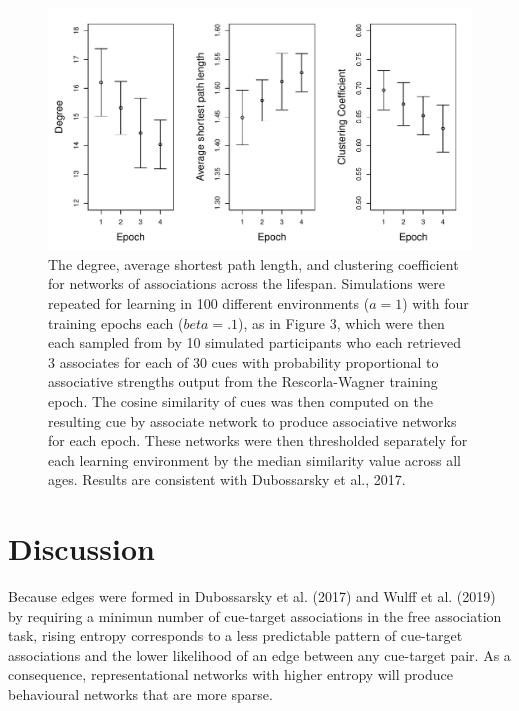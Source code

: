 \documentclass[
  man]{apa6}
\begin{document}
\begin{figure}

{\centering \includegraphics[width=1\linewidth]{NetworkAssociations} 

}

\caption{The degree, average shortest path length, and clustering coefficient for networks of associations across the lifespan. Simulations were repeated for learning in 100 different environments ($a=1$) with four training epochs each ($beta=.1$), as in Figure 3, which were then each sampled from by 10 simulated participants who each retrieved 3 associates for each of 30 cues with probability proportional to associative strengths output from the Rescorla-Wagner training epoch. The cosine similarity of cues was then computed on the resulting cue by associate network to produce associative networks for each epoch. These networks were then thresholded separately for each learning environment by the median similarity value across all ages. Results are consistent with Dubossarsky et al., 2017.}\label{fig:unnamed-chunk-2}
\end{figure}

\hypertarget{discussion}{%
\section{Discussion}\label{discussion}}

Because edges were formed in Dubossarsky et al. (2017) and Wulff et al. (2019) by requiring a minimun number of cue-target associations in the free association task, rising entropy corresponds to a less predictable pattern of cue-target associations and the lower likelihood of an edge between any cue-target pair. As a consequence, representational networks with higher entropy will produce behavioural networks that are more sparse.
\end{document}
